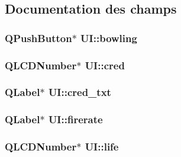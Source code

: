 \subsection{Documentation des champs}
\hypertarget{classUI_a8279bd03cdee4ab01f04152f2ea7a906}{
\subsubsection[{bowling}]{\setlength{\rightskip}{0pt plus 5cm}QPushButton$\ast$ {\bf UI::bowling}}}
\label{classUI_a8279bd03cdee4ab01f04152f2ea7a906}
\hypertarget{classUI_a1e6f0b63d2e4cb88476541452f81bd64}{
\subsubsection[{cred}]{\setlength{\rightskip}{0pt plus 5cm}QLCDNumber$\ast$ {\bf UI::cred}}}
\label{classUI_a1e6f0b63d2e4cb88476541452f81bd64}
\hypertarget{classUI_a931c707005030131187d786b0966fc22}{
\subsubsection[{cred\_\-txt}]{\setlength{\rightskip}{0pt plus 5cm}QLabel$\ast$ {\bf UI::cred\_\-txt}}}
\label{classUI_a931c707005030131187d786b0966fc22}
\hypertarget{classUI_a58bde2e8f6ca9d8f2fa32affefa02045}{
\subsubsection[{firerate}]{\setlength{\rightskip}{0pt plus 5cm}QLabel$\ast$ {\bf UI::firerate}}}
\label{classUI_a58bde2e8f6ca9d8f2fa32affefa02045}
\hypertarget{classUI_a19d84baf49aecab7730ae12609b83be7}{
\subsubsection[{life}]{\setlength{\rightskip}{0pt plus 5cm}QLCDNumber$\ast$ {\bf UI::life}}}
